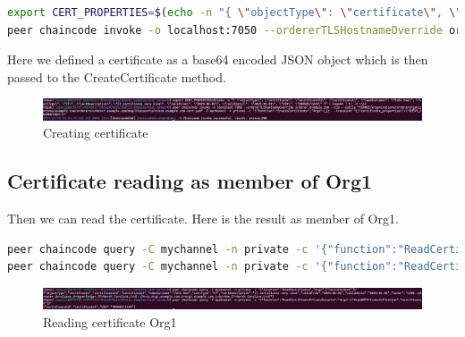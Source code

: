 \documentclass[12pt]{article}
\begin{document}
\begin{lstlisting}[language=bash]
export CERT_PROPERTIES=$(echo -n "{ \"objectType\": \"certificate\", \"certificateId\": \"certificate1\", \"nameSurname\": \"John Doe\", \"certType\": \"IT\", \"certDescription\": \"IT certificate very nice\", \"validFrom\": \"2024-01-01\", \"validUntil\": \"2025-01-01\", \"UID\": \"990101/1234\" }" | base64 | tr -d \\n)
peer chaincode invoke -o localhost:7050 --ordererTLSHostnameOverride orderer.example.com --tls --cafile "${PWD}/organizations/ordererOrganizations/example.com/orderers/orderer.example.com/msp/tlscacerts/tlsca.example.com-cert.pem" -C mychannel -n private -c '{"function":"CreateCertificate","Args":[]}' --transient "{\"certificate_properties\":\"$CERT_PROPERTIES\"}"
\end{lstlisting}

Here we defined a certificate as a base64 encoded JSON object which is then passed to the CreateCertificate method.

\begin{figure}[H]
    \centering
    \includegraphics[width=\textwidth]{imgs/creating_certificate.PNG}
    \caption{Creating certificate}
    \label{fig:creatingcertificate}
\end{figure}

\subsection{Certificate reading as member of Org1}

Then we can read the certificate. Here is the result as member of Org1.

\begin{lstlisting}[language=bash]
peer chaincode query -C mychannel -n private -c '{"function":"ReadCertificate","Args":["certificate1"]}'
peer chaincode query -C mychannel -n private -c '{"function":"ReadCertificatePrivateDetails","Args":["Org1MSPPrivateCollection","certificate1"]}'
\end{lstlisting}

\begin{figure}[H]
    \centering
    \includegraphics[width=\textwidth]{imgs/reading_certificate_org1.PNG}
    \caption{Reading certificate Org1}
    \label{fig:readingcertificate}
\end{figure}
\end{document}
